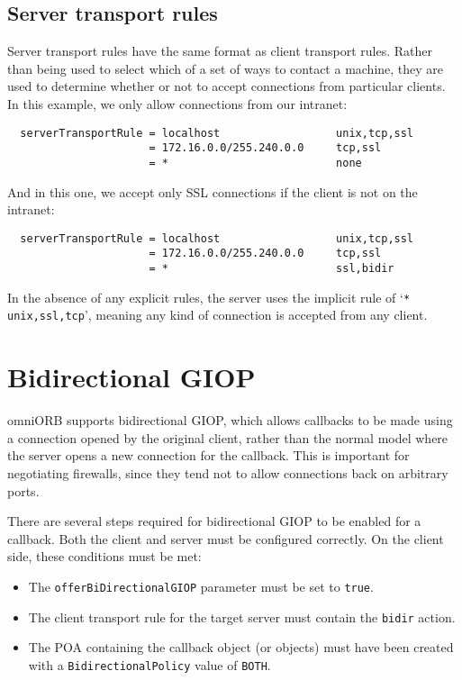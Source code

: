 \documentclass[11pt,twoside,a4paper]{book}
\newcommand{\code}[1]{\texttt{#1}}
\newcommand{\dsc}{\discretionary{}{}{}}
\begin{document}
\subsection{Server transport rules}
\label{sec:serverRule}

Server transport rules have the same format as client transport
rules. Rather than being used to select which of a set of ways to
contact a machine, they are used to determine whether or not to accept
connections from particular clients. In this example, we only allow
connections from our intranet:

\begin{verbatim}
  serverTransportRule = localhost                  unix,tcp,ssl
                      = 172.16.0.0/255.240.0.0     tcp,ssl
                      = *                          none
\end{verbatim}

\noindent And in this one, we accept only SSL connections if the
client is not on the intranet:

\begin{verbatim}
  serverTransportRule = localhost                  unix,tcp,ssl
                      = 172.16.0.0/255.240.0.0     tcp,ssl
                      = *                          ssl,bidir
\end{verbatim}

\noindent In the absence of any explicit rules, the server uses the
implicit rule of `\code{* unix,\dsc{}ssl,tcp}', meaning any kind of
connection is accepted from any client.


\section{Bidirectional GIOP}
\label{sec:bidir}

omniORB supports bidirectional GIOP, which allows callbacks to be made
using a connection opened by the original client, rather than the
normal model where the server opens a new connection for the callback.
This is important for negotiating firewalls, since they tend not to
allow connections back on arbitrary ports.

There are several steps required for bidirectional GIOP to be enabled
for a callback. Both the client and server must be configured
correctly. On the client side, these conditions must be met:

\begin{itemize}

\item The \code{offerBiDirectionalGIOP} parameter must be set to \code{true}. 
\item The client transport rule for the target server must contain the
      \code{bidir} action.
\item The POA containing the callback object (or objects) must have
      been created with a \code{BidirectionalPolicy} value of
      \code{BOTH}.

\end{itemize}
\end{document}
